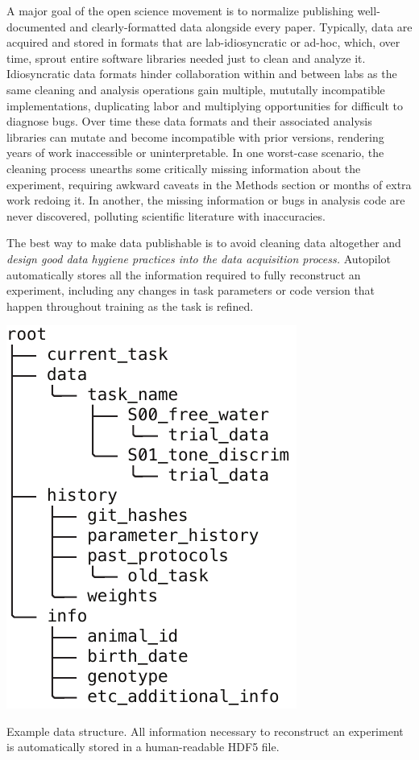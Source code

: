 A major goal of the open science movement is to normalize publishing well-documented and clearly-formatted data alongside every paper. Typically, data are acquired and stored in formats that are lab-idiosyncratic or ad-hoc, which, over time, sprout entire software libraries needed just to clean and analyze it. Idiosyncratic data formats hinder collaboration within and between labs as the same cleaning and analysis operations gain multiple, mututally incompatible implementations, duplicating labor and multiplying opportunities for difficult to diagnose bugs. Over time these data formats and their associated analysis libraries can mutate and become incompatible with prior versions, rendering years of work inaccessible or uninterpretable. In one worst-case scenario, the cleaning process unearths some critically missing information about the experiment, requiring awkward caveats in the Methods section or months of extra work redoing it. In another, the missing information or bugs in analysis code are never discovered, polluting scientific literature with inaccuracies. 

The best way to make data publishable is to avoid cleaning data altogether and \textit{design good data hygiene practices into the data acquisition process.} Autopilot automatically stores all the information required to fully reconstruct an experiment, including any changes in task parameters or code version that happen throughout training as the task is refined.

\begin{marginfigure}[0.5cm]
\includegraphics[]{figures/side_16_data.pdf}
\caption{Example data structure. All information necessary to reconstruct an experiment is automatically stored in a human-readable HDF5 file.}
\label{fig:datastx}
\end{marginfigure}


